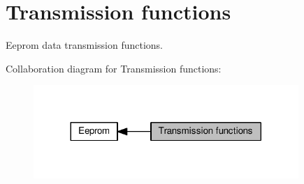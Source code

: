 \hypertarget{group___eeprom___trans}{}\section{Transmission functions}
\label{group___eeprom___trans}


Eeprom data transmission functions.  


Collaboration diagram for Transmission functions\+:\nopagebreak
\begin{figure}[H]
\begin{center}
\leavevmode
\includegraphics[width=284pt]{d2/de3/group___eeprom___trans}
\end{center}
\end{figure}
